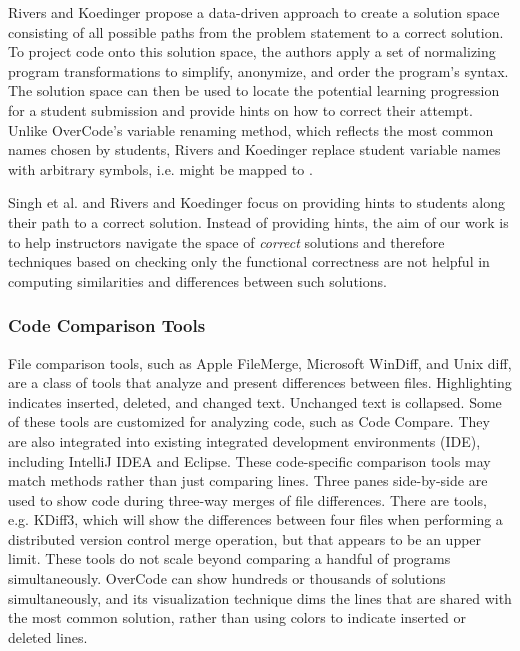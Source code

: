 Rivers and Koedinger \citeyear{riversaied} propose a data-driven approach to create a solution space consisting of all possible paths from the problem statement to a correct solution. To project code onto this solution space, the authors apply a set of normalizing program transformations to simplify, anonymize, and order the program’s syntax. The solution space can then be used to locate the potential learning progression for a student submission and provide hints on how to correct their attempt. Unlike OverCode’s variable renaming method, which reflects the most common names chosen by students, Rivers and Koedinger replace student variable names with arbitrary symbols, i.e.  might be mapped to . 

Singh et al. and Rivers and Koedinger focus on providing hints to students along their path to a correct solution. Instead of providing hints, the aim of our work is to help instructors navigate the space of \emph{correct} solutions and therefore techniques based on checking only the functional correctness are not helpful in computing similarities and differences between such solutions.

\subsubsection{Code Comparison Tools}
File comparison tools, such as Apple FileMerge, Microsoft WinDiff, and Unix diff, are a class of tools that analyze and present differences between files. Highlighting indicates inserted, deleted, and changed text. Unchanged text is collapsed. Some of these tools are customized for analyzing code, such as Code Compare. They are also integrated into existing integrated development environments (IDE), including IntelliJ IDEA and Eclipse. These code-specific comparison tools may match methods rather than just comparing lines. Three panes side-by-side are used to show code during three-way merges of file differences. There are tools, e.g. KDiff3, which will show the differences between four files when performing a distributed version control merge operation, but that appears to be an upper limit. These tools do not scale beyond comparing a handful of programs simultaneously. OverCode can show hundreds or thousands of solutions simultaneously, and its visualization technique dims the lines that are shared with the most common solution, rather than using colors to indicate inserted or deleted lines.

